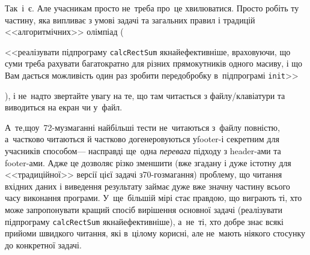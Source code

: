 Так~і~є. Але учасникам просто не~треба про~це хвилюватися. Просто робіть ту частину, яка випливає з умові задачі та загальних правил і традицій <<алгоритмічних>> олімпіад (\begin{slshape}<<реалізувати підпрограму \texttt{calcRectSum} якнайефективніше, враховуючи, що суми треба рахувати багатократно для різних прямокутників одного масиву, і що Вам дається можливість один раз зробити передобробку в~підпрограмі \texttt{init}>>\end{slshape}), і не~надто звертайте увагу на те, що там читається з файлу/\nolinebreak[2]клавіатури та виводиться на екран чи у~файл.

А~те,\nolinebreak[2] що\nolinebreak[2] у~\mbox{72-му}\nolinebreak[3] змаганні найбільші тести не~читаються з~файлу повністю, а~частково читаються й частково догенеровуються у\nolinebreak[2] \mbox{footer-і} секретним для учасників способом\nolinebreak[3] --- насправді ще~одна \emph{перевага} \mbox{підходу} з header-ами та footer-ами. Адже це дозволяє різко зменшити (вже згадану і дуже істотну для <<традиційної>> версії цієї задачі з\nolinebreak[3] \mbox{70-го}\nolinebreak[3] змагання) проблему, що читання вхідних даних і виведення результату займає дуже вже значну частину всього часу виконання програми. У~ще~більшій мірі стає правдою, що виграють ті, хто може запропонувати кращий спосіб вирішення основної задачі (реалізувати підпрограму \texttt{calcRectSum} якнайефективніше), а~не~ті, хто добре знає всякі прийоми швидкого читання, які в~цілому корисні, але не~мають ніякого стосунку до конкретної задачі.